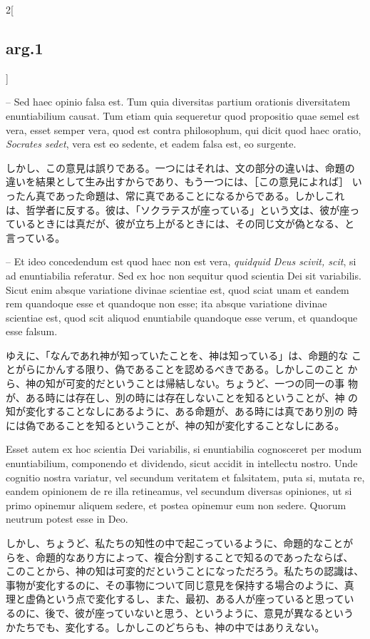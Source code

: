 \documentclass[paper=a4paper,fontsize=10pt,jafontsize=9pt,titlepage]{jlreq}
\begin{document}
\begin{paracol}{2}[\subsection{arg.1}]
\switchcolumn*

-- Sed haec opinio falsa est. Tum quia diversitas partium orationis
diversitatem enuntiabilium causat. Tum etiam quia sequeretur quod
propositio quae semel est vera, esset semper vera, quod est contra
philosophum, qui dicit quod haec oratio, {\itshape Socrates sedet},
vera est eo sedente, et eadem falsa est, eo surgente.

\switchcolumn

しかし、この意見は誤りである。一つにはそれは、文の部分の違いは、命題の
違いを結果として生み出すからであり、もう一つには、［この意見によれば］
いったん真であった命題は、常に真であることになるからである。しかしこれ
は、哲学者に反する。彼は、「ソクラテスが座っている」という文は、彼が座っ
ているときには真だが、彼が立ち上がるときには、その同じ文が偽となる、と
言っている。

\switchcolumn*

-- Et ideo concedendum est quod haec non est vera, {\itshape quidquid
Deus scivit, scit}, si ad enuntiabilia referatur. Sed ex hoc non
sequitur quod scientia Dei sit variabilis. Sicut enim absque
variatione divinae scientiae est, quod sciat unam et eandem rem
quandoque esse et quandoque non esse; ita absque variatione divinae
scientiae est, quod scit aliquod enuntiabile quandoque esse verum, et
quandoque esse falsum.

\switchcolumn

ゆえに、「なんであれ神が知っていたことを、神は知っている」は、命題的な
ことがらにかんする限り、偽であることを認めるべきである。しかしこのこと
から、神の知が可変的だということは帰結しない。ちょうど、一つの同一の事
物が、ある時には存在し、別の時には存在しないことを知るということが、神
の知が変化することなしにあるように、ある命題が、ある時には真であり別の
時には偽であることを知るということが、神の知が変化することなしにある。

\switchcolumn*

Esset autem ex hoc scientia Dei variabilis, si enuntiabilia
cognosceret per modum enuntiabilium, componendo et dividendo, sicut
accidit in intellectu nostro. Unde cognitio nostra variatur, vel
secundum veritatem et falsitatem, puta si, mutata re, eandem opinionem
de re illa retineamus, vel secundum diversas opiniones, ut si primo
opinemur aliquem sedere, et postea opinemur eum non sedere. Quorum
neutrum potest esse in Deo.

\switchcolumn

しかし、ちょうど、私たちの知性の中で起こっているように、命題的なことが
らを、命題的なあり方によって、複合分割することで知るのであったならば、
このことから、神の知は可変的だということになっただろう。私たちの認識は、
事物が変化するのに、その事物について同じ意見を保持する場合のように、真
理と虚偽という点で変化するし、また、最初、ある人が座っていると思ってい
るのに、後で、彼が座っていないと思う、というように、意見が異なるという
かたちでも、変化する。しかしこのどちらも、神の中ではありえない。

\end{paracol}
\end{document}
